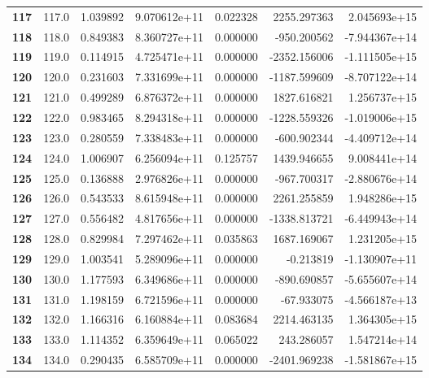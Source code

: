 \documentclass{report}[12pt]
\begin{document}
\begin{center}
\begin{tabular}{lrrrrrr}
\textbf{117 } &          117.0 &   1.039892 &  9.070612e+11 &    0.022328 &  2255.297363 &  2.045693e+15 \\
\textbf{118 } &          118.0 &   0.849383 &  8.360727e+11 &    0.000000 &  -950.200562 & -7.944367e+14 \\
\textbf{119 } &          119.0 &   0.114915 &  4.725471e+11 &    0.000000 & -2352.156006 & -1.111505e+15 \\
\textbf{120 } &          120.0 &   0.231603 &  7.331699e+11 &    0.000000 & -1187.599609 & -8.707122e+14 \\
\textbf{121 } &          121.0 &   0.499289 &  6.876372e+11 &    0.000000 &  1827.616821 &  1.256737e+15 \\
\textbf{122 } &          122.0 &   0.983465 &  8.294318e+11 &    0.000000 & -1228.559326 & -1.019006e+15 \\
\textbf{123 } &          123.0 &   0.280559 &  7.338483e+11 &    0.000000 &  -600.902344 & -4.409712e+14 \\
\textbf{124 } &          124.0 &   1.006907 &  6.256094e+11 &    0.125757 &  1439.946655 &  9.008441e+14 \\
\textbf{125 } &          125.0 &   0.136888 &  2.976826e+11 &    0.000000 &  -967.700317 & -2.880676e+14 \\
\textbf{126 } &          126.0 &   0.543533 &  8.615948e+11 &    0.000000 &  2261.255859 &  1.948286e+15 \\
\textbf{127 } &          127.0 &   0.556482 &  4.817656e+11 &    0.000000 & -1338.813721 & -6.449943e+14 \\
\textbf{128 } &          128.0 &   0.829984 &  7.297462e+11 &    0.035863 &  1687.169067 &  1.231205e+15 \\
\textbf{129 } &          129.0 &   1.003541 &  5.289096e+11 &    0.000000 &    -0.213819 & -1.130907e+11 \\
\textbf{130 } &          130.0 &   1.177593 &  6.349686e+11 &    0.000000 &  -890.690857 & -5.655607e+14 \\
\textbf{131 } &          131.0 &   1.198159 &  6.721596e+11 &    0.000000 &   -67.933075 & -4.566187e+13 \\
\textbf{132 } &          132.0 &   1.166316 &  6.160884e+11 &    0.083684 &  2214.463135 &  1.364305e+15 \\
\textbf{133 } &          133.0 &   1.114352 &  6.359649e+11 &    0.065022 &   243.286057 &  1.547214e+14 \\
\textbf{134 } &          134.0 &   0.290435 &  6.585709e+11 &    0.000000 & -2401.969238 & -1.581867e+15 \\

\end{tabular}
\end{center}
\end{document}
